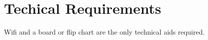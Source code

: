 \section{Techical Requirements}

Wifi and a board or flip chart are the only technical aids required.